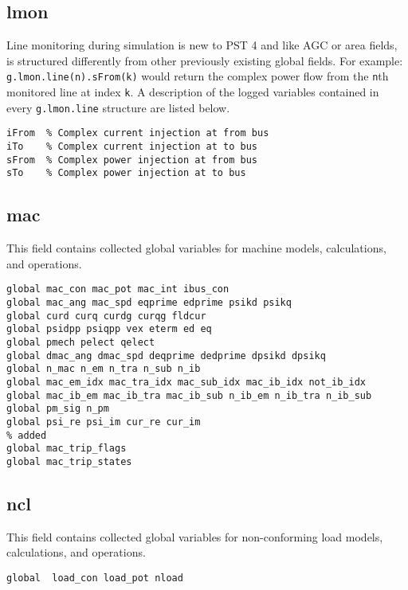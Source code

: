 \subsection{lmon}  
Line monitoring during simulation is new to PST 4 and like AGC or area fields, is structured  differently from other previously existing global fields.
For example:\\ \verb|g.lmon.line(n).sFrom(k)| would return the complex power flow from the \verb|n|th monitored line at index \verb|k|.
A description of the logged variables contained in every \verb|g.lmon.line| structure are listed below.

\begin{verbatim}
iFrom  % Complex current injection at from bus
iTo    % Complex current injection at to bus
sFrom  % Complex power injection at from bus
sTo    % Complex power injection at to bus
\end{verbatim}

\subsection{mac}
This field contains collected global variables for machine models, calculations, and operations.
\begin{verbatim}
global mac_con mac_pot mac_int ibus_con
global mac_ang mac_spd eqprime edprime psikd psikq
global curd curq curdg curqg fldcur
global psidpp psiqpp vex eterm ed eq
global pmech pelect qelect
global dmac_ang dmac_spd deqprime dedprime dpsikd dpsikq
global n_mac n_em n_tra n_sub n_ib
global mac_em_idx mac_tra_idx mac_sub_idx mac_ib_idx not_ib_idx
global mac_ib_em mac_ib_tra mac_ib_sub n_ib_em n_ib_tra n_ib_sub
global pm_sig n_pm 
global psi_re psi_im cur_re cur_im
% added
global mac_trip_flags
global mac_trip_states
\end{verbatim}

\subsection{ncl}
This field contains collected global variables for non-conforming load models, calculations, and operations.
\begin{verbatim}
global  load_con load_pot nload
\end{verbatim}

